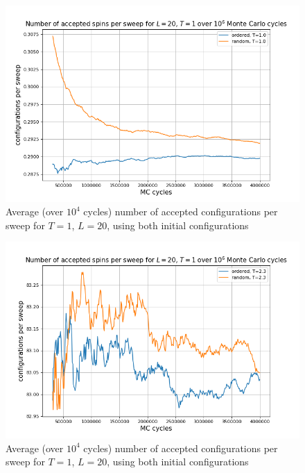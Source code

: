 \documentclass[%
oneside,                 %
final,                   %
10pt]{article}
\begin{document}
\begin{figure}[!htb]
        \centering 
         \includegraphics[scale=.45]{../Results/L20T1_acceptedconfigs.png} 
        \caption{Average (over $10^4$ cycles) number of accepted configurations per sweep for $T=1$, $L=20$, using both initial configurations}
        \label{fig:SPIN.configsT1}   
\end{figure} 
\begin{figure}[!htb]
        \centering 
         \includegraphics[scale=.45]{../Results/L20T2_acceptedconfigs.png} 
        \caption{Average (over $10^4$ cycles) number of accepted configurations per sweep for $T=1$, $L=20$, using both initial configurations}
        \label{fig:SPIN.configsT23}   
\end{figure} 
\end{document}
